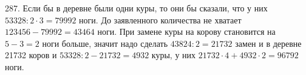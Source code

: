 287. Если бы в деревне были одни куры, то они бы сказали, что у них $53328:2\cdot3=79992$ ноги. До заявленного количества не хватает $123456-79992=43464$ ноги. При замене куры на корову становится на $5-3=2$ ноги больше, значит надо сделать $43824:2=21732$ замен и в деревне 21732 коров и $53328:2-21732=4932$ куры, у них $21732\cdot4+4932\cdot2=96792$ ноги.\\
